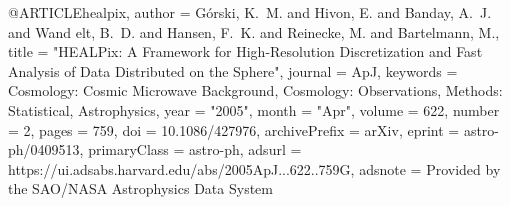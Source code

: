 
@ARTICLE{healpix,
       author = {{G{\'o}rski}, K.~M. and {Hivon}, E. and {Banday}, A.~J. and {Wand
        elt}, B.~D. and {Hansen}, F.~K. and {Reinecke}, M. and {Bartelmann}, M.},
        title = "{HEALPix: A Framework for High-Resolution Discretization and Fast Analysis of Data Distributed on the Sphere}",
      journal = {ApJ},
     keywords = {Cosmology: Cosmic Microwave Background, Cosmology: Observations, Methods: Statistical, Astrophysics},
         year = "2005",
        month = "Apr",
       volume = {622},
       number = {2},
        pages = {759},
          doi = {10.1086/427976},
archivePrefix = {arXiv},
       eprint = {astro-ph/0409513},
 primaryClass = {astro-ph},
       adsurl = {https://ui.adsabs.harvard.edu/abs/2005ApJ...622..759G},
      adsnote = {Provided by the SAO/NASA Astrophysics Data System}
}
